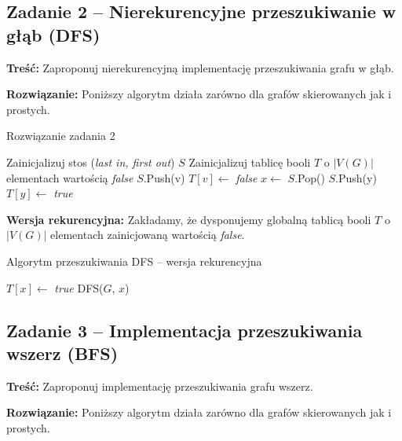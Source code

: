 \subsection{Zadanie 2 -- Nierekurencyjne przeszukiwanie w głąb (DFS)}
\textbf{Treść: } Zaproponuj nierekurencyjną implementację
przeszukiwania grafu w głąb.

\textbf{Rozwiązanie:}
Poniższy algorytm działa zarówno dla grafów skierowanych
jak i prostych.

\begin{algorithm}[H]
	\caption{Rozwiązanie zadania 2}\label{Zadanie22a}
	\begin{algorithmic}[1]
		\State Zainicjalizuj stos (\textit{last in, first out}) $S$
		\State Zainicjalizuj tablicę booli $T$ o $|V(G)|$ elementach wartością 
		\textit{false}
		\State $S$.Push(v)
		\State $T[v] \gets$ \textit{false}
		\State $x \gets$ $S$.Pop()
		\State $S$.Push(y)
		\State $T[y] \gets$ \textit{true} 
		\EndIf
		\EndWhile
		\EndWhile
		\EndProcedure
	\end{algorithmic}
\end{algorithm}

\textbf{Wersja rekurencyjna:} Zakładamy, że dysponujemy globalną
tablicą booli $T$ o $|V(G)|$ elementach zainicjowaną wartością 
\textit{false}.

\begin{algorithm}[H]
	\caption{Algorytm przeszukiwania DFS -- wersja rekurencyjna}\label{Zadanie22b}
	\begin{algorithmic}[1]
		\State $T[x] \gets$ \textit{true}
		\State DFS($G$, $x$)
		\EndIf
		\EndWhile
		\EndProcedure
	\end{algorithmic}
\end{algorithm}

\subsection{Zadanie 3 -- Implementacja przeszukiwania wszerz (BFS)}

\textbf{Treść: } Zaproponuj implementację
przeszukiwania grafu wszerz.

\textbf{Rozwiązanie:}
Poniższy algorytm działa zarówno dla grafów skierowanych
jak i prostych.


